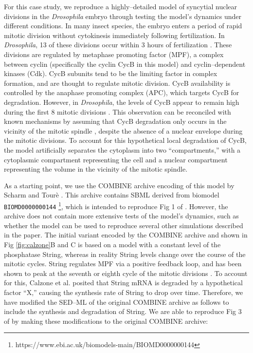 \documentclass[10pt,letterpaper]{article}
\begin{document}
For this case study, we reproduce a highly--detailed model of syncytial nuclear divisions in the \textit{Drosophila} embryo \cite{calzone2007dynamical} through testing the model's dynamics under different conditions.
In many insect species, the embryo enters a period of rapid mitotic division without cytokinesis \cite{gilbertDevBiol} immediately following fertilization. In \textit{Drosophila}, 13 of these divisions occur within 3 hours of fertilization \cite{calzone2007dynamical}. These divisions are regulated by metaphase promoting factor (MPF), a complex between cyclin (specifically the cyclin CycB in this model) and cyclin--dependent kinases (Cdk). CycB subunits tend to be the limiting factor in complex formation, and are thought to regulate mitotic division. CycB availability is controlled by the anaphase promoting complex (APC), which targets CycB for degradation. However, in \textit{Drosophila}, the levels of CycB appear to remain high during the first 8 mitotic divisions \cite{edgar1994distinct}. This observation can be reconciled with known mechanisms by assuming that CycB degradation only occurs in the vicinity of the mitotic spindle \cite{calzone2007dynamical,huang2002dynamic,raff2002roles}, despite the absence of a nuclear envelope during the mitotic divisions. To account for this hypothetical local degradation of CycB, the model artificially separates the cytoplasm into two ``compartments,'' with a cytoplasmic compartment representing the cell and a nuclear compartment representing the volume in the vicinity of the mitotic spindle.%

As a starting point, we use the COMBINE archive encoding of this model by Scharm and Tour\`{e} \cite{scharmShowcase}. This archive contains SBML derived from biomodel \texttt{BIOMD0000000144} \footnote{https://www.ebi.ac.uk/biomodels-main/BIOMD0000000144}, which is intended to reproduce Fig 1 of \cite{calzone2007dynamical}. However, the archive does not contain more extensive tests of the model's dynamics, such as whether the model can be used to reproduce several other simulations described  in the paper. The initial variant encoded by the COMBINE archive and shown in Fig \ref{fig:calzone}B and C is based on a model with a constant level of the phosphatase String, whereas in reality String levels change over the course of the mitotic cycles. String regulates MPF via a positive feedback loop, and has been shown to peak at the seventh or eighth cycle of the mitotic divisions \cite{calzone2007dynamical}. To account for this, Calzone et al. \cite{calzone2007dynamical} posited that String mRNA is degraded by a hypothetical factor ``X,'' causing the synthesis rate of String to drop over time.
Therefore, we have modified the SED--ML of the original COMBINE archive \cite{scharmShowcase} as follows to include the synthesis and degradation of String. We are able to reproduce Fig 3 of \cite{calzone2007dynamical} by making these modifications to the original COMBINE archive:
\end{document}
